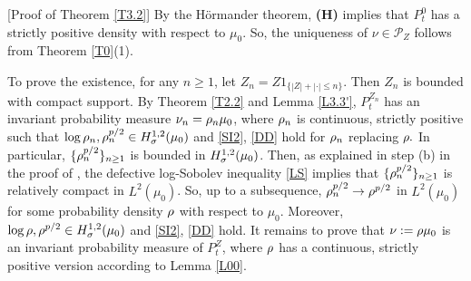 \documentclass[12pt,leqno]{article}
\theoremstyle{definition}
\newcommand{\scr}[1]{\mathscr #1}
\numberwithin{equation}{section} \theoremstyle{remark}
\begin{document}
[Proof of Theorem \ref{T3.2}] By the H\"ormander theorem, {\bf (H)} implies that $P_t^0$ has a strictly positive density with respect to $\mu_0$. So, the uniqueness of $\nu\in \scr P_Z$ follows from Theorem \ref{T0}(1).

To prove the existence,
for any $n\ge 1$, let $Z_n= Z1_{\{|Z|+|\cdot|\le n\}}.$ Then $Z_n$ is bounded with compact support. By Theorem \ref{T2.2} and Lemma \ref{L3.3'}, $P_t^{Z_n}$ has an invariant probability measure $\nu_n=\rho_n\mu_0$, where $\rho_n$ is continuous, strictly positive  such that   $\log\rho_n, \rho_n^{p/2}\in H_\sigma^{1,2}(\mu_0)$ and \eqref{SI2}, \eqref{DD} hold for $\rho_n$ replacing $\rho.$ In particular,    $\{\rho_n^{p/2}\}_{n\ge 1}$ is bounded  in $H_\sigma^{1,2}(\mu_0)$. Then, as explained in step (b) in the proof of \cite[Theorem 2.3(1)]{W16},  the defective log-Sobolev inequality \eqref{LS} implies that  $\{\rho_n^{p/2}\}_{n\ge 1}$ is relatively compact in $L^2(\mu_0)$. So,    up to a subsequence,  $\rho_n^{p/2}\rightarrow \rho^{p/2}$ in $L^2(\mu_0)$ for some probability density $\rho$ with respect to $\mu_0$. Moreover, $\log\rho, \rho^{p/2}\in H_\sigma^{1,2}(\mu_0)$ and \eqref{SI2}, \eqref{DD} hold.
It remains to prove that $\nu:=\rho\mu_0$ is an invariant probability measure of $P_t^Z$, where $\rho$ has a continuous, strictly positive version according to Lemma \ref{L00}.
\end{document}

